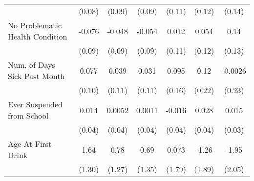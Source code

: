 {\begin{tabular}{l*{6}{c}}
            &      (0.08)         &      (0.09)         &      (0.09)         &      (0.11)         &      (0.12)         &      (0.14)         \\
\addlinespace
No Problematic Health Condition&      -0.076         &      -0.048         &      -0.054         &       0.012         &       0.054         &        0.14         \\
            &      (0.09)         &      (0.09)         &      (0.09)         &      (0.11)         &      (0.12)         &      (0.13)         \\
\addlinespace
Num. of Days Sick Past Month&       0.077         &       0.039         &       0.031         &       0.095         &        0.12         &     -0.0026         \\
            &      (0.10)         &      (0.11)         &      (0.11)         &      (0.16)         &      (0.22)         &      (0.23)         \\
\addlinespace
Ever Suspended from School&       0.014         &      0.0052         &      0.0011         &      -0.016         &       0.028         &       0.015         \\
            &      (0.04)         &      (0.04)         &      (0.04)         &      (0.04)         &      (0.04)         &      (0.03)         \\
\addlinespace
Age At First Drink&        1.64         &        0.78         &        0.69         &       0.073         &       -1.26         &       -1.95         \\
            &      (1.30)         &      (1.27)         &      (1.35)         &      (1.79)         &      (1.89)         &      (2.05)         \\
\bottomrule
\end{tabular}
}
